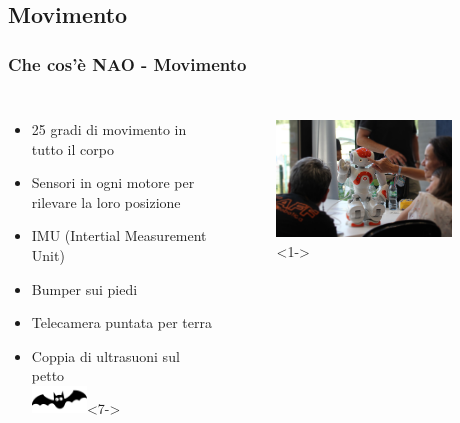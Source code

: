\documentclass[aspectratio=169]{beamer}
\begin{document}
\subsection{Movimento}
\begin{frame}
\frametitle{Che cos'è NAO - Movimento}
\begin{columns}
		\begin{itemize}
			\item<1-> 25 gradi di movimento in tutto il corpo
			\item<2-> Sensori in ogni motore per rilevare la loro posizione
			\item<3-> IMU (Intertial Measurement Unit)
			\item<4-> Bumper sui piedi
			\item<5-> Telecamera puntata per terra
			\item<6-> Coppia di ultrasuoni sul petto\\

			\includegraphics[width=0.3\textwidth]{pipistrello.png}<7->
		\end{itemize}
		\begin{figure}[ht]
		\begin{center}
		\includegraphics[width=0.9\textwidth]{nao3.jpg}<1->
		\end{center}
		\end{figure}
\end{columns}
\end{frame}
\end{document}
